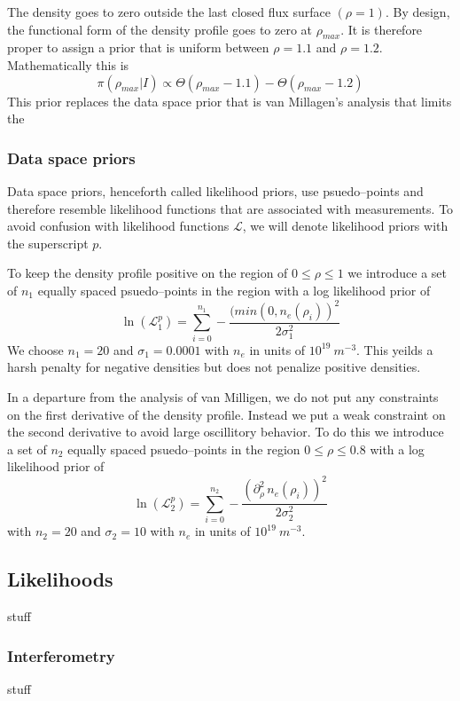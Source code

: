 \documentclass[12pt]{article}
\numberwithin{equation}{section}
\begin{document}
The density goes to zero outside the last closed flux surface $(\rho=1)$. By design, the functional form of the density profile goes to zero at $\rho_{max}$. It is therefore proper to assign a prior that is uniform between $\rho = 1.1$ and $\rho = 1.2$. Mathematically this is
\begin{equation} \label{eq:rhomaxprior}
	\pi(\rho_{max}|I) \propto \Theta(\rho_{max}-1.1)-\Theta(\rho_{max} - 1.2)
\end{equation}
This prior replaces the data space prior that is van Millagen's analysis that limits the  
\subsubsection{Data space priors}
Data space priors, henceforth called likelihood priors, use psuedo--points and therefore resemble likelihood functions that are associated with measurements. To avoid confusion with likelihood functions $\mathcal{L}$, we will denote likelihood priors with the superscript $p$. 

To keep the density profile positive on the region of $0 \le \rho \le 1$ we introduce a set of $n_1$ equally spaced psuedo--points in the region with a log likelihood prior of 
\begin{equation} \label{eq:pos_prior}
	\ln(\mathcal{L}^p_1) = \sum \limits_{i=0}^{n_1} -\frac{(min(0,n_e(\rho_i))^2}{2 \sigma_1^2}
\end{equation}  
We choose $n_1=20$ and $\sigma_1 = 0.0001$ with $n_e$ in units of $10^{19}\: m^{-3}$. This yeilds a harsh penalty for negative densities but does not penalize positive densities. 

In a departure from the analysis of van Milligen, we do not put any constraints on the first derivative of the density profile. Instead we put a weak constraint on the second derivative to avoid large oscillitory behavior. To do this we introduce a set of $n_2$ equally spaced psuedo--points in the region $0 \le \rho \le 0.8$ with a log likelihood prior of
\begin{equation} \label{eq:second_prior}
	\ln(\mathcal{L}^p_2) = \sum \limits_{i=0}^{n_2}-\frac{(\partial^2_{\rho}\, n_e(\rho_i))^2}{2 \sigma_2^2}
\end{equation} 
with $n_2=20$ and $\sigma_2=10$ with $n_e$ in units of $10^{19}\: m^{-3}$. 
\subsection{Likelihoods}
stuff
\subsubsection{Interferometry}
stuff
\end{document}
